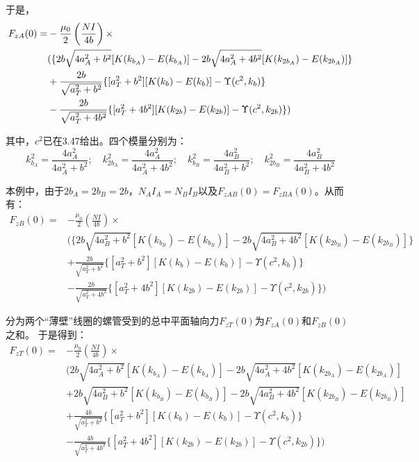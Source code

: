 于是，
\begin{align}
F_{zA}(0)=&-\frac{\mu_0}{2}\left(\frac{N I}{4b}\right)\times \\\notag
&( \{2b\sqrt{4a_A^2+b^2}[K(k_{b_A})-E(k_{b_A})]-2b\sqrt{4a_A^2+4b^2}[K(k_{2b_A})-E(k_{2b_A})]\}\\\notag
&+\frac{2b}{\sqrt{a_T^2+b^2}} \{[a_T^2+b^2][K(k_{b})-E(k_{b})]-\Upsilon(c^2,k_b)\}\\\notag
&-\frac{2b}{\sqrt{a_T^2+4b^2}} \{[a_T^2+4b^2][K(k_{2b})-E(k_{2b})]-\Upsilon(c^2,k_{2b}) \})
\end{align}

其中，$c^2$已在3.47给出。四个模量分别为：
$$k_{b_A}^2=\frac{4a_A^2}{4a_A^2+b^2} ;\quad k_{2b_A}^2=\frac{4a^2_A}{4a_A^2+4b^2};\quad
k_{b_B}^2=\frac{4a_B^2}{4a_B^2+b^2} ;\quad k_{2b_B}^2=\frac{4a^2_B}{4a_B^2+4b^2} $$

本例中，由于$2b_A=2b_B=2b$，$N_A I_A=N_B I_B$以及$F_{zAB}(0)=F_{zBA}(0)$。从而有：
\begin{equation*}
\begin{split}
F_{zB}(0)=&-\frac{\mu_0}{2}\left(\frac{N I}{4b}\right)\times \\
&\bigg( \{2b\sqrt{4a_B^2+b^2}[K(k_{b_B})-E(k_{b_B})]-2b\sqrt{4a_B^2+4b^2}[K(k_{2b_B})-E(k_{2b_B})]\}\\
&+\frac{2b}{\sqrt{a_T^2+b^2}} \{[a_T^2+b^2][K(k_{b})-E(k_{b})]-\Upsilon(c^2,k_b)\}\\
&-\frac{2b}{\sqrt{a_T^2+4b^2}} \{[a_T^2+4b^2][K(k_{2b})-E(k_{2b})]-\Upsilon(c^2,k_{2b}) \}\bigg)
\end{split}\tag{3.53b}
\end{equation*}

分为两个``薄壁''线圈的螺管受到的总中平面轴向力$F_{zT}(0)$为$F_{zA}(0)$和$F_{zB}(0)$之和。
于是得到：
\begin{equation}
\begin{split}
F_{zT}(0)=&-\frac{\mu_0}{2}\left(\frac{N I}{4b}\right)\times \\
&\bigg(2b\sqrt{4a_A^2+b^2}[K(k_{b_A})-E(k_{b_A})]-2b\sqrt{4a_A^2+4b^2}[K(k_{2b_A})-E(k_{2b_A})]\\
&+2b\sqrt{4a_B^2+b^2}[K(k_{b_B})-E(k_{b_B})]-2b\sqrt{4a_B^2+4b^2}[K(k_{2b_B})-E(k_{2b_B})]\\
&+\frac{4b}{\sqrt{a_T^2+b^2}} \{[a_T^2+b^2][K(k_{b})-E(k_{b})]-\Upsilon(c^2,k_b)\}\\
&-\frac{4b}{\sqrt{a_T^2+4b^2}} \{[a_T^2+4b^2][K(k_{2b})-E(k_{2b})]-\Upsilon(c^2,k_{2b}) \}\bigg)
\end{split}
\end{equation}

